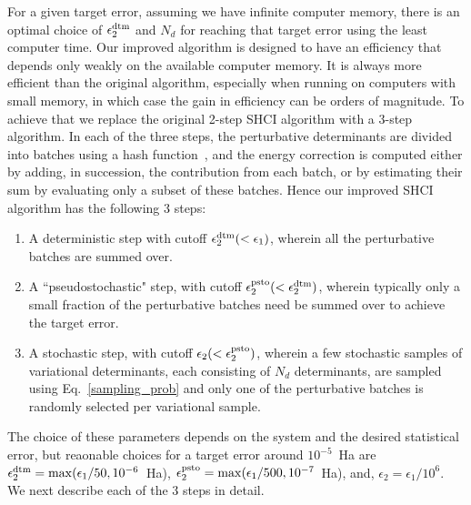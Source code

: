 \documentclass[%
reprint,
 superscriptaddress,
 amsmath,amssymb,
 aps,
]{revtex4-1}
\begin{document}
For a given target error, assuming we have infinite computer memory, there is an optimal choice of $\epsilon_2^{\rm dtm}$ and $N_d$
for reaching that target error using the least computer time.
Our improved algorithm is designed to have an efficiency that depends only weakly on the available computer memory.
It is always more efficient than the original algorithm, especially when running on computers with small memory, in which case the
gain in efficiency can be orders of magnitude.
To achieve that we replace the original 2-step SHCI algorithm with a 3-step algorithm.
In each of the three steps, the perturbative determinants are divided into batches using a hash function~\cite{Jen-Hash-97, Boost-2012},
and the energy correction is computed either by adding, in succession, the contribution from each batch,
or by estimating their sum by evaluating
only a subset of these batches.
Hence our improved SHCI algorithm has the following 3 steps:
\begin{enumerate}
\item A deterministic step with cutoff $\epsilon_2^{\rm dtm} (< \epsilon_1)$, wherein all the perturbative batches are summed over.
\item A ``pseudostochastic" step, with cutoff $\epsilon_2^{\rm psto} (< \epsilon_2^{\rm dtm})$, wherein typically only a small fraction of the perturbative batches
need be summed over to achieve the target error.
\item A stochastic step, with cutoff $\epsilon_2 (<\epsilon_2^{\rm psto}) $, wherein a few stochastic samples of variational determinants,
each consisting of $N_d$ determinants, are sampled using Eq.~\ref{sampling_prob} and only one of the
perturbative batches is randomly selected per variational sample.
\end{enumerate}
The choice of these parameters depends on the system and the desired statistical error, but
reaonable choices for a target error around $10^{-5}$~Ha are  $\epsilon_2^{\rm dtm} = \max(\epsilon_{1}/50,10^{-6}$~Ha),
$\epsilon_2^{\rm psto} = \max(\epsilon_{1}/500,10^{-7}$~Ha), and,
$\epsilon_2 = \epsilon_{1}/10^6$.
We next describe each of the 3 steps in detail.
\end{document}
